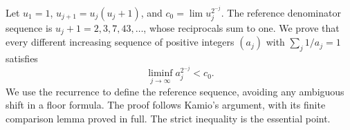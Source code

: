 Let $u_1=1$, $u_{j+1}=u_j(u_j+1)$, and $c_0=\lim u_j^{2^{-j}}$. The reference denominator sequence is $u_j+1=2,3,7,43,\ldots$, whose reciprocals sum to one. We prove that every different increasing sequence of positive integers $(a_j)$ with $\sum_j1/a_j=1$ satisfies
\[
 \liminf_{j\to\infty}a_j^{2^{-j}}<c_0.
\]
We use the recurrence to define the reference sequence, avoiding any ambiguous shift in a floor formula. The proof follows Kamio's argument, with its finite comparison lemma proved in full. The strict inequality is the essential point.
